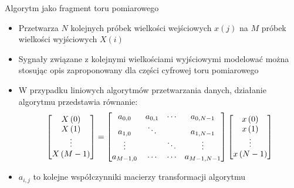 \documentclass[12pt, polish, aspectratio = 169]{beamer}
\begin{document}
\begin{frame}{Algorytm jako fragment toru pomiarowego}
\begin{itemize}
\item Przetwarza $N$ kolejnych próbek wielkości wejściowych $x(j)$ na $M$ próbek wielkości wyjściowych $X(i)$
\item Sygnały związane z kolejnymi wielkościami wyjściowymi modelować można stosując opis zaproponowany dla części cyfrowej toru pomiarowego
\item W przypadku liniowych algorytmów przetwarzania danych, działanie algorytmu przedstawia równanie:
\begin{equation}
\begin{bmatrix}
X \left(0\right)   \\
X \left(1\right)   \\
\vdots      \\
X \left(M-1\right)
\end{bmatrix}
=
\begin{bmatrix}
a_{0, 0}   &   a_{0, 1} &   \cdots   &   a_{0, N-1}      \\
a_{1, 0}   &   \ddots   &            &   a_{1, N-1}      \\
\vdots     &            &   \ddots   &   \vdots          \\
a_{M-1, 0} &   \cdots   &   \cdots   &   a_{M-1, N-1}
\end{bmatrix}
\begin{bmatrix}
x \left(0\right)   \\
x \left(1\right)   \\
\vdots      \\
x \left(N-1\right)
\end{bmatrix}
\label{eq:alg_out_mat}
\end{equation}
\item $a_{i,j}$ to kolejne współczynniki macierzy transformacji algorytmu
\end{itemize}
\end{frame}
\end{document}
